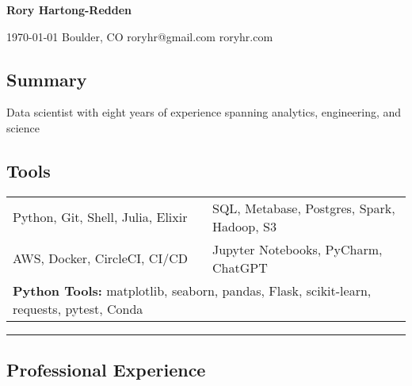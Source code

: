 \documentclass[10pt,letterpaper]{article}
\newenvironment{indentsection}[1]
{\begin{list}{}%
	{\setlength{\leftmargin}{#1}}
	\item[]%
}
{\end{list}}
\begin{document}
{\raggedright \LARGE \bf Rory Hartong-Redden}

{\raggedleft 
\today \/ \textbar
\/ Boulder, CO \textbar
\/ roryhr@gmail.com \textbar
\/ roryhr.com
\\
}

\subsection*{Summary}
\begin{centering}  
Data scientist with eight years of experience spanning analytics, engineering, and science\\
\end{centering}

\subsection*{Tools}
\begin{indentsection}{\parindent}
\begin{tabular}{p{0.5\linewidth}   p{0.5\linewidth}} 
	Python, Git, Shell, Julia, Elixir
	& SQL, Metabase, Postgres, Spark, Hadoop, S3 \\

	AWS, Docker, CircleCI, CI/CD
	& Jupyter Notebooks, PyCharm, ChatGPT\\ 
	
	\multicolumn{2}{l}{
		\textbf{Python Tools:} matplotlib, seaborn, pandas, Flask, scikit-learn, requests, pytest, Conda
		}
\end{tabular}
\end{indentsection}

\hrule
\subsection*{Professional Experience}
\end{document}
